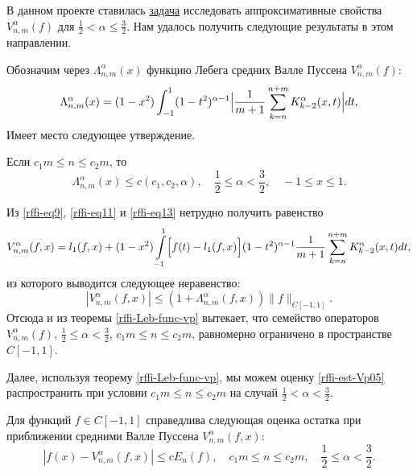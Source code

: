В данном проекте ставилась \hyperlink{task2}{задача} исследовать аппроксимативные свойства $V_{n,m}^\alpha(f)$ для $\frac{1}{2} < \alpha \le \frac{3}{2}$. Нам удалось получить следующие результаты в этом направлении.

Обозначим через $\Lambda_{n,m}^\alpha(x)$ функцию Лебега средних Валле Пуссена $V_{n,m}^\alpha(f)$:
\begin{equation*}
\Lambda_{n,m}^\alpha(x)=
(1-x^2)\int_{-1}^{1}(1-t^2)^{\alpha-1}\Bigl|
\frac{1}{m+1}\sum\limits_{k=n}^{n+m}K^\alpha_{k-2}(x,t)
\Bigr|dt,
\end{equation*}
Имеет место следующее утверждение.
\begin{theorem}\label{rffi-Leb-func-vp}
Если $c_1 m \le n \le c_2 m$, то
\begin{equation}
  \Lambda_{n,m}^\alpha(x)\le c(c_1, c_2, \alpha), \quad \frac12 \le \alpha < \frac32, \quad -1 \le x \le 1.
\end{equation}
\end{theorem}

Из \eqref{rffi-eq9}, \eqref{rffi-eq11} и \eqref{rffi-eq13} нетрудно получить равенство
\begin{equation*}
V_{n,m}^\alpha(f,x)=
l_1(f,x)+(1-x^2)\int\limits_{-1}^{1}
\Bigl[
f(t)-l_1(f,x)
\Bigr]
(1-t^2)^{\alpha-1}\frac{1}{m+1}\sum\limits_{k=n}^{n+m}K_{k-2}^\alpha(x,t)dt,
\end{equation*}
из которого выводится следующее неравенство:
\begin{equation*}
|V_{n,m}^\alpha(f,x)| \le (1+\Lambda_{n,m}^\alpha(f,x))\|f\|_{C[-1,1]}.
\end{equation*}
Отсюда и из теоремы \ref{rffi-Leb-func-vp} вытекает, что семейство операторов $V_{n,m}^\alpha(f)$, $\frac12\le \alpha < \frac32$, $c_1m \le n\le c_2m$, равномерно ограничено в пространстве $C[-1,1]$.

Далее, используя теорему \ref{rffi-Leb-func-vp}, мы можем оценку \eqref{rffi-est-Vp05} распространить при условии $c_1 m \le n \le c_2 m$ на случай $\frac{1}{2} < \alpha < \frac{3}{2}$.
\begin{theorem}
Для функций $f \in C[-1,1]$ справедлива следующая оценка остатка при приближении средними Валле Пуссена $V_{n,m}^\alpha(f,x)$:
\begin{equation*}
|f(x)-V_{n,m}^\alpha(f,x)| \le c E_n(f),
\quad c_1 m \le n \le c_2 m, \quad \frac{1}{2} \le \alpha < \frac{3}{2}.
\end{equation*}
\end{theorem}



